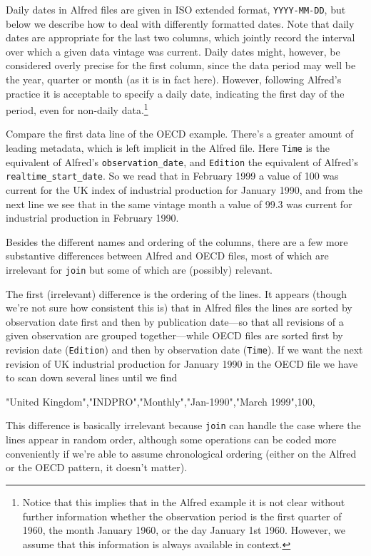 Daily dates in Alfred files are given in ISO extended format,
\texttt{YYYY-MM-DD}, but below we describe how to deal with
differently formatted dates. Note that daily dates are appropriate for
the last two columns, which jointly record the interval over which a
given data vintage was current. Daily dates might, however, be
considered overly precise for the first column, since the data period
may well be the year, quarter or month (as it is in fact
here). However, following Alfred's practice it is acceptable to
specify a daily date, indicating the first day of the period, even for
non-daily data.\footnote{Notice that this implies that in the Alfred
  example it is not clear without further information whether the
  observation period is the first quarter of 1960, the month January
  1960, or the day January 1st 1960.  However, we assume that this
  information is always available in context.}

Compare the first data line of the OECD example. There's a greater
amount of leading metadata, which is left implicit in the Alfred
file. Here \texttt{Time} is the equivalent of Alfred's
\verb|observation_date|, and \texttt{Edition} the equivalent of
Alfred's \verb|realtime_start_date|. So we read that in February 1999
a value of 100 was current for the UK index of industrial production
for January 1990, and from the next line we see that in the same
vintage month a value of 99.3 was current for industrial production in
February 1990.

Besides the different names and ordering of the columns, there are a
few more substantive differences between Alfred and OECD files, most
of which are irrelevant for \texttt{join} but some of which are
(possibly) relevant.

The first (irrelevant) difference is the ordering of the lines. It
appears (though we're not sure how consistent this is) that in Alfred
files the lines are sorted by observation date first and then by
publication date---so that all revisions of a given observation are
grouped together---while OECD files are sorted first by revision date
(\texttt{Edition}) and then by observation date (\texttt{Time}). If we
want the next revision of UK industrial production for January 1990 in
the OECD file we have to scan down several lines until we find
\begin{code}
"United Kingdom","INDPRO","Monthly","Jan-1990","March 1999",100,
\end{code}
This difference is basically irrelevant because \texttt{join} can
handle the case where the lines appear in random order, although some
operations can be coded more conveniently if we're able to assume
chronological ordering (either on the Alfred or the OECD pattern, it
doesn't matter).

